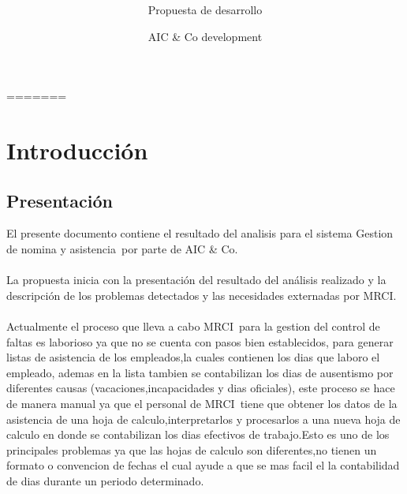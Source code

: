 \documentclass[10pt]{book}
\title{\nombreProyecto\\}
\subtitle{\bigskip Propuesta de desarrollo}
\author{AIC \& Co development }
\newcommand{\nombreProyecto}{Gestion de nomina y asistencia}
\newcommand{\empresa}{AIC \& Co}
\newcommand{\cliente}{MRCI}
\begin{document}
 


\pagestyle{empty}

=======

\maketitle


\chapter{Introducción} 

\section{Presentación}

	El presente documento contiene el resultado del analisis  para el sistema \nombreProyecto \  por parte de  \empresa.
	\\
	\\
	La propuesta inicia con la presentación del resultado del análisis realizado y la descripción de los problemas detectados y las necesidades externadas por \cliente.
        \\\\
        
	Actualmente el proceso que lleva a cabo \cliente \ para la gestion del control de faltas es laborioso ya que no se cuenta con pasos bien establecidos, para generar listas de asistencia
	de los empleados,la cuales contienen los dias que laboro el empleado,  ademas en la lista tambien se contabilizan los dias de ausentismo por diferentes causas (vacaciones,incapacidades y dias oficiales),
	este proceso se hace de manera manual ya que el personal de \cliente  \ tiene que obtener los datos de la asistencia de una hoja de calculo,interpretarlos y procesarlos a una nueva hoja de calculo
	en donde se contabilizan los dias efectivos de trabajo.Esto es uno de los principales problemas ya que las hojas de calculo son diferentes,no tienen un formato o convencion de fechas el 
	cual ayude a que se mas facil el la contabilidad de dias durante un periodo determinado.
	
\end{document}
